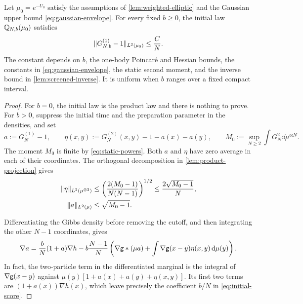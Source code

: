 \documentclass[11pt,reqno]{amsart}
\numberwithin{equation}{section}
\theoremstyle{plain}
\theoremstyle{remark}
\DeclarePairedDelimiter{\norm}{\lVert}{\rVert}
\begin{document}
\begin{prop}\label{prop:initial-mark}
Let $\mu_0=e^{-U_0}$ satisfy the assumptions of \cref{lem:weighted-elliptic} and the Gaussian upper bound \eqref{eq:gaussian-envelope}. For every fixed $b\ge0$, the initial law $\mathbb Q_{N,b}(\mu_0)$ satisfies
\begin{equation}\label{eq:initial-mark}
 \norm{G_{N,b}^{(1)}-1}_{L^2(\mu_0)}\le\frac C N.
\end{equation}
The constant depends on $b$, the one-body Poincar\'e and Hessian bounds, the constants in \eqref{eq:gaussian-envelope}, the static second moment, and the inverse bound in \cref{lem:screened-inverse}. It is uniform when $b$ ranges over a fixed compact interval.
\end{prop}
\begin{proof}
For $b=0$, the initial law is the product law and there is nothing to prove. For $b>0$, suppress the initial time and the preparation parameter in the densities, and set
\begin{equation}\label{eq:initial-projections}
 a:=G_N^{(1)}-1,\qquad
 \eta(x,y):=G_N^{(2)}(x,y)-1-a(x)-a(y),\qquad
 M_0:=\sup_{N\ge2}\int G_N^2\dd\mu^{\otimes N}.
\end{equation}
The moment $M_0$ is finite by \eqref{eq:static-powers}. Both $a$ and $\eta$ have zero average in each of their coordinates. The orthogonal decomposition in \cref{lem:product-projection} gives
\begin{align}
 \norm\eta_{L^2(\mu^{\otimes2})}
 &\le\left(\frac{2(M_0-1)}{N(N-1)}\right)^{1/2}
 \le\frac{2\sqrt{M_0-1}}N,\label{eq:static-pair-projection}\\
 \norm a_{L^2(\mu)}&\le\sqrt{M_0-1}.\label{eq:static-one-projection}
\end{align}

Differentiating the Gibbs density before removing the cutoff, and then integrating the other $N-1$ coordinates, gives
\begin{equation}\label{eq:initial-score}
 \nabla a=\frac bN(1+a)\nabla h
 -b\frac{N-1}{N}\left(\nabla\mathsf g*(\mu a)
               +\int\nabla\mathsf g(x-y)\eta(x,y)\,\mathrm d\mu(y)\right).
\end{equation}
In fact, the two-particle term in the differentiated marginal is the integral of $\nabla\mathsf g(x-y)$ against $\mu(y)[1+a(x)+a(y)+\eta(x,y)]$. Its first two terms are $(1+a(x))\nabla h(x)$, which leave precisely the coefficient $b/N$ in \eqref{eq:initial-score}.


\end{proof}
\end{document}
